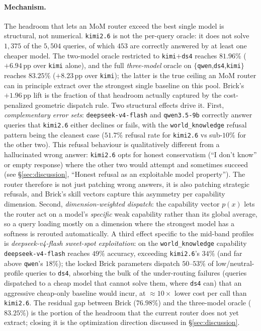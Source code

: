 \documentclass[twocolumn,10pt,a4paper]{article}
\begin{document}
\paragraph{Mechanism.} The headroom that lets an MoM router exceed the best single model is structural, not numerical. \texttt{kimi2.6} is not the per-query oracle: it does not solve $1{,}375$ of the $5{,}504$ queries, of which $453$ are correctly answered by at least one cheaper model. The two-model oracle restricted to \texttt{kimi}$+$\texttt{ds4} reaches $81.96\%$ ($+6.94$\,pp over \texttt{kimi} alone), and the full \emph{three-model} oracle on $\{$\texttt{qwen},\texttt{ds4},\texttt{kimi}$\}$ reaches $83.25\%$ ($+8.23$\,pp over \texttt{kimi}); the latter is the true ceiling an MoM router can in principle extract over the strongest single baseline on this pool. Brick's $+1.96$\,pp lift is the fraction of that headroom actually captured by the cost-penalized geometric dispatch rule. Two structural effects drive it. First, \emph{complementary error sets}: \texttt{deepseek-v4-flash} and \texttt{qwen3.5-9b} correctly answer queries that \texttt{kimi2.6} either declines or fails, with the \texttt{world\_knowledge} refusal pattern being the cleanest case ($51.7\%$ refusal rate for \texttt{kimi2.6} vs sub-$10\%$ for the other two). This refusal behaviour is qualitatively different from a hallucinated wrong answer: \texttt{kimi2.6} opts for honest conservatism (``I don't know'' or empty response) where the other two would attempt and sometimes succeed (see §\ref{sec:discussion}, ``Honest refusal as an exploitable model property''). The router therefore is not just patching wrong answers, it is also patching strategic refusals, and Brick's skill vectors capture this asymmetry per capability dimension. Second, \emph{dimension-weighted dispatch}: the capability vector $p(x)$ lets the router act on a model's \emph{specific} weak capability rather than its global average, so a query loading mostly on a dimension where the strongest model has a softness is rerouted automatically. A third effect specific to the mid-band profiles is \emph{deepseek-v4-flash sweet-spot exploitation}: on the \texttt{world\_knowledge} capability \texttt{deepseek-v4-flash} reaches $49\%$ accuracy, exceeding \texttt{kimi2.6}'s $34\%$ (and far above \texttt{qwen}'s $18\%$); the locked Brick parameters dispatch $50$--$53\%$ of low/neutral-profile queries to \texttt{ds4}, absorbing the bulk of the under-routing failures (queries dispatched to a cheap model that cannot solve them, where \texttt{ds4} can) that an aggressive cheap-only baseline would incur, at $\approx 10{\times}$ lower cost per call than \texttt{kimi2.6}. The residual gap between Brick ($76.98\%$) and the three-model oracle ($83.25\%$) is the portion of the headroom that the current router does not yet extract; closing it is the optimization direction discussed in §\ref{sec:discussion}.
\end{document}
